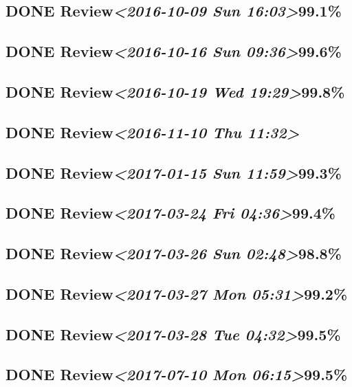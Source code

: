 \documentclass[11pt]{ctexart}
\begin{document}
\subsection{{\bfseries\sffamily DONE} Review\textit{<2016-10-09 Sun 16:03>}99.1\%}
\label{sec:orge83b9a8}
\subsection{{\bfseries\sffamily DONE} Review\textit{<2016-10-16 Sun 09:36>}99.6\%}
\label{sec:org93828a1}
\subsection{{\bfseries\sffamily DONE} Review\textit{<2016-10-19 Wed 19:29>}99.8\%}
\label{sec:orge689070}
\subsection{{\bfseries\sffamily DONE} Review\textit{<2016-11-10 Thu 11:32>}}
\label{sec:orgbd1ba54}
\subsection{{\bfseries\sffamily DONE} Review\textit{<2017-01-15 Sun 11:59>}99.3\%}
\label{sec:orga955ba1}
\subsection{{\bfseries\sffamily DONE} Review\textit{<2017-03-24 Fri 04:36>}99.4\%}
\label{sec:org3adb927}
\subsection{{\bfseries\sffamily DONE} Review\textit{<2017-03-26 Sun 02:48>}98.8\%}
\label{sec:org0ef9819}
\subsection{{\bfseries\sffamily DONE} Review\textit{<2017-03-27 Mon 05:31>}99.2\%}
\label{sec:orgf87f81f}
\subsection{{\bfseries\sffamily DONE} Review\textit{<2017-03-28 Tue 04:32>}99.5\%}
\label{sec:org9d9e05d}
\subsection{{\bfseries\sffamily DONE} Review\textit{<2017-07-10 Mon 06:15>}99.5\%}
\label{sec:orga12d4ef}
\end{document}
